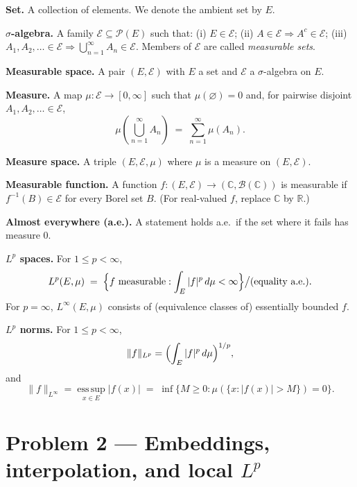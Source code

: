 \documentclass[12pt,a4paper]{article}
\theoremstyle{plain}
\theoremstyle{definition}
\theoremstyle{remark}
\theoremstyle{remark}
\newenvironment{spacy}{\begingroup\setlength{\parskip}{6pt}\setlength{\parindent}{0pt}}{\endgroup}
\theoremstyle{definition}
\begin{document}
\begin{spacy}
	\textbf{Set.}
	A collection of elements. We denote the ambient set by $E$.
	
	\textbf{$\sigma$-algebra.}
	A family $\mathcal E\subseteq \mathcal P(E)$ such that:
	(i) $E\in\mathcal E$; \;
	(ii) $A\in\mathcal E \Rightarrow A^{c}\in\mathcal E$; \;
	(iii) $A_1,A_2,\dots\in\mathcal E \Rightarrow \bigcup_{n=1}^\infty A_n\in\mathcal E$.
	Members of $\mathcal E$ are called \emph{measurable sets}.
	
	\textbf{Measurable space.}
	A pair $(E,\mathcal E)$ with $E$ a set and $\mathcal E$ a $\sigma$-algebra on $E$.
	
	\textbf{Measure.}
	A map $\mu:\mathcal E\to[0,\infty]$ such that $\mu(\varnothing)=0$ and, for pairwise disjoint
	$A_1,A_2,\dots\in\mathcal E$,
	\[
	\mu\!\left(\bigcup_{n=1}^\infty A_n\right) \;=\; \sum_{n=1}^\infty \mu(A_n).
	\]
	
	\textbf{Measure space.}
	A triple $(E,\mathcal E,\mu)$ where $\mu$ is a measure on $(E,\mathcal E)$.
	
	\textbf{Measurable function.}
	A function $f:(E,\mathcal E)\to(\mathbb C,\mathcal B(\mathbb C))$ is measurable if
	$f^{-1}(B)\in\mathcal E$ for every Borel set $B$.
	(For real-valued $f$, replace $\mathbb C$ by $\mathbb R$.)
	
	\textbf{Almost everywhere (a.e.).}
	A statement holds a.e.\ if the set where it fails has measure $0$.
	
	\textbf{$L^{p}$ spaces.}
	For $1\le p<\infty$,
	\[
	L^{p}(E,\mu) \;=\; \Bigl\{ f \text{ measurable} : \int_E |f|^{p}\,d\mu < \infty \Bigr\}
	\big/ \text{(equality a.e.)}.
	\]
	For $p=\infty$, $L^\infty(E,\mu)$ consists of (equivalence classes of) essentially bounded $f$.
	
	\textbf{$L^{p}$ norms.}
	For $1\le p<\infty$,
	\[
	\|f\|_{L^{p}}=\Bigl(\int_E |f|^{p}\,d\mu\Bigr)^{1/p},
	\]
	and
	\[
	\|f\|_{L^{\infty}}=\operatorname*{ess\,sup}_{x\in E} |f(x)|
	\;=\; \inf\{ M\ge 0 : \mu(\{x:|f(x)|>M\})=0\}.
	\]
\end{spacy}

\section*{Problem 2 — Embeddings, interpolation, and local $L^p$}
\end{document}
